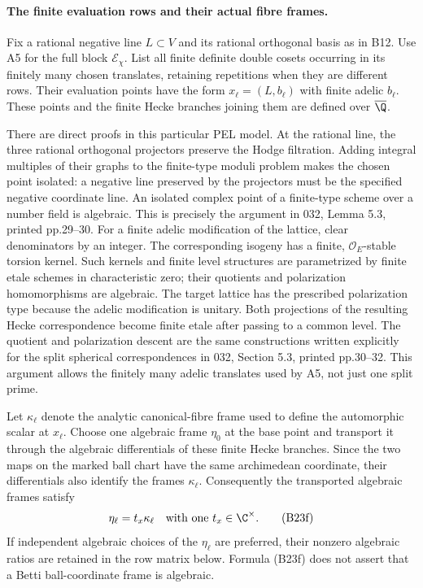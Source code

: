 \paragraph{The finite evaluation rows and their actual fibre frames.}
Fix a rational negative line $L\subset V$ and its rational
orthogonal basis as in B12.  Use A5 for the full block
$\mathcal E_\chi$.  List all finite definite double cosets
occurring in its finitely many chosen translates, retaining
repetitions when they are different rows.  Their evaluation
points have the form $x_\ell=(L,b_\ell)$ with finite
adelic $b_\ell$.  These points and the finite Hecke branches
joining them are defined over $\overline\Q$.

There are direct proofs in this particular PEL model.
At the rational line, the three rational orthogonal
projectors preserve the Hodge filtration.  Adding integral
multiples of their graphs to the finite-type moduli
problem makes the chosen point isolated: a negative line
preserved by the projectors must be the specified negative
coordinate line.  An isolated complex point of a
finite-type scheme over a number field is algebraic.
This is precisely the argument in 032, Lemma 5.3,
printed pp.29--30.  For a finite adelic modification of
the lattice, clear denominators by an integer.  The
corresponding isogeny has a finite, $\mathcal O_E$-stable
torsion kernel.  Such kernels and finite level structures
are parametrized by finite etale schemes in characteristic
zero; their quotients and polarization homomorphisms are
algebraic.  The target lattice has the prescribed
polarization type because the adelic modification is
unitary.  Both projections of the resulting Hecke
correspondence become finite etale after passing to a
common level.  The quotient and polarization descent are
the same constructions written explicitly for the split
spherical correspondences in 032, Section 5.3,
printed pp.30--32.  This argument allows the finitely many
adelic translates used by A5, not just one split prime.

Let $\kappa_\ell$ denote the analytic canonical-fibre frame
used to define the automorphic scalar at $x_\ell$.  Choose
one algebraic frame $\eta_0$ at the base point and transport
it through the algebraic differentials of these finite
Hecke branches.  Since the two maps on the marked ball
chart have the same archimedean coordinate, their
differentials also identify the frames $\kappa_\ell$.
Consequently the transported algebraic frames satisfy
\[
                  \eta_\ell=t_x\kappa_\ell
                  \quad\hbox{with one }t_x\in\C^\times.
 \tag{B23f}
\]
If independent algebraic choices of the $\eta_\ell$ are
preferred, their nonzero algebraic ratios are retained
in the row matrix below.  Formula (B23f) does not assert
that a Betti ball-coordinate frame is algebraic.


